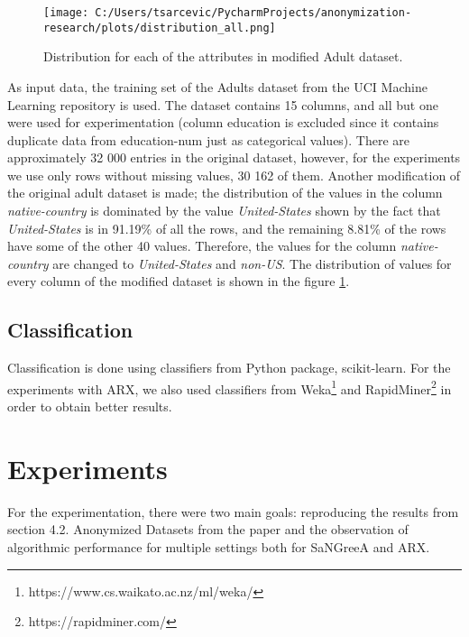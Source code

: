 \documentclass{article}
\begin{document}
\begin{figure}
	\texttt{[image: C:/Users/tsarcevic/PycharmProjects/anonymization-research/plots/distribution\_all.png]}
	\caption{Distribution for each of the attributes in modified Adult dataset.}
 	\label{fig:distribution}
\end{figure}

As input data, the training set of the Adults dataset from the UCI Machine Learning repository is used. The dataset contains 15 columns, and all but one were used for experimentation (column education is excluded since it contains duplicate data from education-num just as categorical values). There are approximately 32 000 entries in the original dataset, however, for the experiments we use only rows without missing values, 30 162 of them. Another modification of the original adult dataset is made; the distribution of the values in the column \textit{native-country} is dominated by the value \textit{United-States} shown by the fact that \textit{United-States} is in 91.19\% of all the rows, and the remaining 8.81\% of the rows have some of the other 40 values. Therefore, the values for the column \textit{native-country} are changed to \textit{United-States} and \textit{non-US}. The distribution of values for every column of the modified dataset is shown in the figure \ref{fig:distribution}.

\subsection{Classification}
Classification is done using classifiers from Python package, scikit-learn. For the experiments with ARX, we also used classifiers from Weka\footnote{https://www.cs.waikato.ac.nz/ml/weka/} and RapidMiner\footnote{https://rapidminer.com/} in order to obtain better results.

\section{Experiments} \label{sec:experiments}
For the experimentation, there were two main goals: reproducing the results from section 4.2. Anonymized Datasets from the paper \cite{malle2017not} and the observation of algorithmic performance for multiple settings both for SaNGreeA and ARX. 
\end{document}
